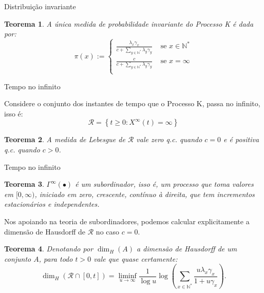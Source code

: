\documentclass[xcolor=pdftex,dvipsnames]{beamer}
\newcommand{\RR}{{\mathcal{R}}}
\newcommand{\Nz}{{\mathbb{N^*}}}
\newcommand{\qc}{{\emph{q.c.}} }
\newtheorem{teorema}{Teorema}
\begin{document}
\begin{frame}{Distribuição invariante}
  \begin{teorema}
    A única medida de probabilidade invariante do Processo K é dada
    por:
    \begin{displaymath}
      \pi(x) := \begin{cases}
        \frac{\lambda_x \gamma_x}{c + \sum_{y \in \Nz} \lambda_y \gamma_y}
        & \textrm{ se } x \in \Nz \\
        \frac{c}{c + \sum_{y \in \Nz} \lambda_y \gamma_y}
        & \textrm{ se } x = \infty \\
      \end{cases}
    \end{displaymath}
  \end{teorema}
\end{frame}


\begin{frame}{Tempo no infinito}

  Considere o conjunto dos instantes de tempo que o Processo K, passa
  no infinito, isso é:
  \begin{displaymath}
    \RR = \left\{ t \geq 0: X^\infty(t) = \infty \right\}
  \end{displaymath}
  \pause
  \begin{teorema}
    A medida de Lebesgue de $\RR$ vale zero \qc quando $c = 0$ e é
    positiva \qc quando $c > 0$.
  \end{teorema}
\end{frame}

\begin{frame}{Tempo no infinito}

  \begin{teorema}
    $\Gamma^\infty(\bullet)$ é um subordinador, isso é, um processo
    que toma valores em $[0, \infty)$, iniciado em zero, crescente,
    contínuo à direita, que tem incrementos estacionários e
    independentes.
  \end{teorema}
  \pause
  Nos apoiando na teoria de subordinadores, podemos calcular
  explicitamente a dimensão de Hausdorff de $\RR$ no caso $c=0$.
  \begin{teorema}
    Denotando por $\dim_H (A)$ a dimensão de Hausdorff de um conjunto
    $A$, para todo $t > 0$ vale que quase certamente:
    \begin{displaymath}
      \dim_H(\RR \cap [0, t]) = 
      \liminf_{u \to \infty} 
      \frac{1}{\log u} \log \left(
        \sum_{x \in \Nz} \frac{u \lambda_x \gamma_x}{1 + u\gamma_x}
      \right).
    \end{displaymath}
  \end{teorema}
\end{frame}
\end{document}
